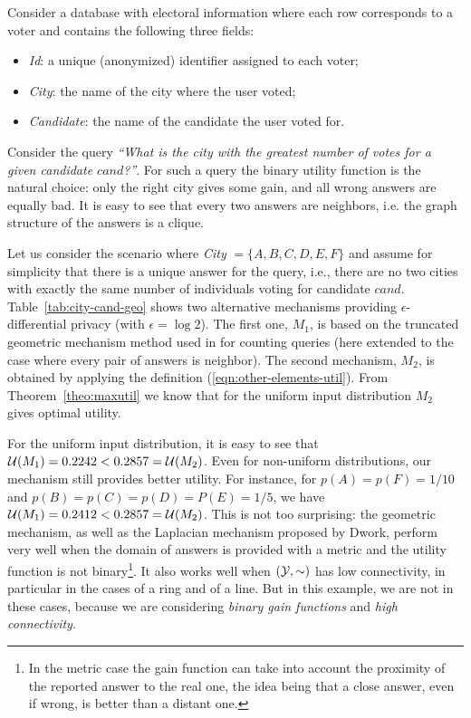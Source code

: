 \documentclass{llncs}
\begin{document}
\begin{example} Consider a database with electoral information where each row corresponds to a voter and contains the following  three fields:

\begin{itemize}
\item \emph{Id}: a unique (anonymized) identifier assigned to each voter;
\item \emph{City}: the name of the city where the user voted;
\item \emph{Candidate}: the name of the candidate the user voted for.
\end{itemize}

Consider the query \emph{``What is the city with the greatest number of votes for a given candidate $\mathit{cand}$?''}. For such a query the binary  utility function is the natural choice: only the right city gives some gain, and all  wrong answers are equally bad. It is easy to see that every two answers are neighbors, i.e. the graph structure of the answers is a clique. 

Let us consider the scenario where \emph{City} $=\{A,B,C,D,E,F\}$ and assume for simplicity that there is a unique answer for the query, i.e., there are no two cities with exactly the same number of individuals voting for candidate $\mathit{cand}$. Table~\ref{tab:city-cand-geo} shows two alternative mechanisms providing $\epsilon$-differential privacy (with $\epsilon = \log 2$). The first one, $M_{1}$, is based on the truncated geometric mechanism method used in \cite{Ghosh:09:STC} for counting queries (here extended to the case where every pair of answers is neighbor). The second mechanism, $M_{2}$, is obtained by applying the definition  (\ref{eqn:other-elements-util}). From 
Theorem~\ref{theo:maxutil} we know that for the uniform input distribution $M_{2}$ gives optimal utility.


For the uniform input distribution, it is easy to see that ${\cal U}(M_1) = 0.2242 < 0.2857 = {\cal U}(M_2)$. Even for non-uniform distributions, our mechanism still provides better utility. For instance, for $p(A) = p(F) = 1/10$ and $p(B) = p(C) = p(D) = P(E) = 1/5$, we have ${\cal U}(M_1) = 0.2412 < 0.2857 = {\cal U}(M_2)$.
This is not too surprising: the geometric mechanism, as well as the Laplacian mechanism proposed by Dwork, perform  very well when the domain of answers is provided with a metric and the utility function is not binary\footnote{In the metric case  the gain function can take into account the proximity of the reported answer to the real one, the idea being that a close answer, even if  wrong, is better than a distant one.}. It also works well when $({\cal Y}, \sim)$ has low connectivity, in particular in the cases of a ring and of a line. But in this example, we are not in these cases, because we are considering \emph{binary gain functions} and \emph{high connectivity}. 


\end{example}
\end{document}
